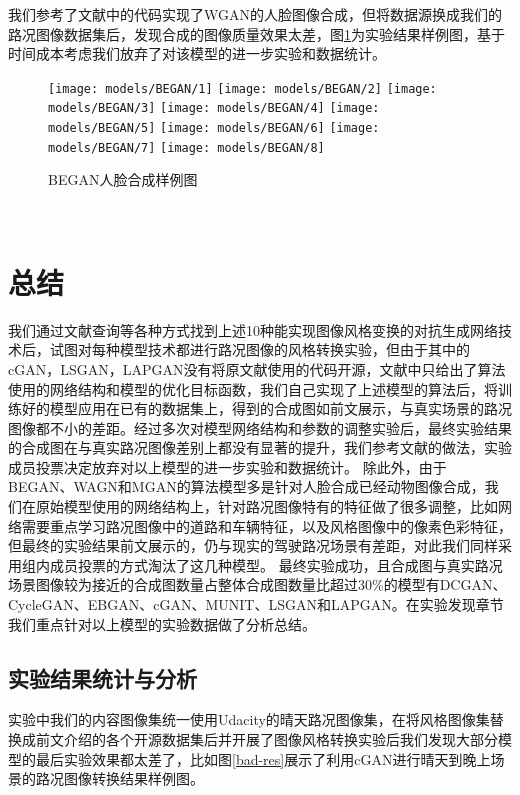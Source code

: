 我们参考了文献中的代码\cite{BEGAN}实现了WGAN的人脸图像合成，但将数据源换成我们的路况图像数据集后，发现合成的图像质量效果太差，图\ref{fig:began}为实验结果样例图，基于时间成本考虑我们放弃了对该模型的进一步实验和数据统计。

\begin{figure}[h]
    \centering
    \texttt{[image: models/BEGAN/1]}
    \texttt{[image: models/BEGAN/2]}
    \texttt{[image: models/BEGAN/3]}
    \texttt{[image: models/BEGAN/4]}
    \texttt{[image: models/BEGAN/5]}
    \texttt{[image: models/BEGAN/6]}
    \texttt{[image: models/BEGAN/7]}
    \texttt{[image: models/BEGAN/8]}
    \caption{BEGAN人脸合成样例图}
    \label{fig:began}
\end{figure}　

\section{总结}

我们通过文献查询等各种方式找到上述10种能实现图像风格变换的对抗生成网络技术后，试图对每种模型技术都进行路况图像的风格转换实验，但由于其中的cGAN，LSGAN，LAPGAN没有将原文献使用的代码开源，文献中只给出了算法使用的网络结构和模型的优化目标函数，我们自己实现了上述模型的算法后，将训练好的模型应用在已有的数据集上，得到的合成图如前文展示，与真实场景的路况图像都不小的差距。经过多次对模型网络结构和参数的调整实验后，最终实验结果的合成图在与真实路况图像差别上都没有显著的提升，我们参考文献\cite{icse-vote}的做法，实验成员投票决定放弃对以上模型的进一步实验和数据统计。
除此外，由于BEGAN、WAGN和MGAN的算法模型多是针对人脸合成已经动物图像合成，我们在原始模型使用的网络结构上，针对路况图像特有的特征做了很多调整，比如网络需要重点学习路况图像中的道路和车辆特征，以及风格图像中的像素色彩特征，但最终的实验结果前文展示的，仍与现实的驾驶路况场景有差距，对此我们同样采用组内成员投票的方式淘汰了这几种模型。
最终实验成功，且合成图与真实路况场景图像较为接近的合成图数量占整体合成图数量比超过30\%的模型有DCGAN、CycleGAN、EBGAN、cGAN、MUNIT、LSGAN和LAPGAN。在实验发现章节我们重点针对以上模型的实验数据做了分析总结。

\subsection{实验结果统计与分析}

实验中我们的内容图像集统一使用Udacity的晴天路况图像集，在将风格图像集替换成前文介绍的各个开源数据集后并开展了图像风格转换实验后我们发现大部分模型的最后实验效果都太差了，比如图\ref{bad-res}展示了利用cGAN进行晴天到晚上场景的路况图像转换结果样例图。

